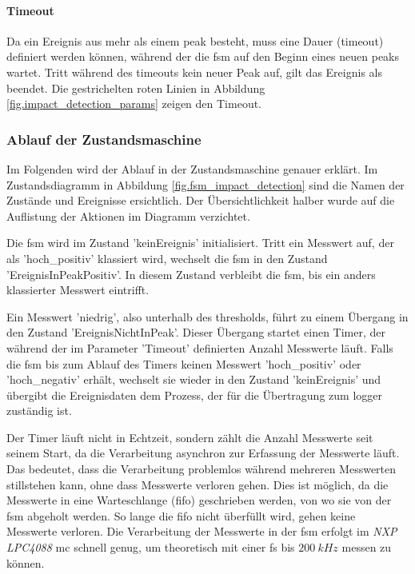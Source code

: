 \paragraph{Timeout} Da ein Ereignis aus mehr als einem \gls{peak} besteht, muss eine Dauer (\gls{timeout}) definiert werden können, während der die \gls{fsm} auf den Beginn eines neuen \gls{peak}s wartet. Tritt während des \gls{timeout}s kein neuer Peak auf, gilt das Ereignis als beendet. Die gestrichelten roten Linien in Abbildung \ref{fig.impact_detection_params} zeigen den Timeout.

\subsubsection{Ablauf der Zustandsmaschine}
Im Folgenden wird der Ablauf in der Zustandsmaschine genauer erklärt. Im Zustandsdiagramm in Abbildung \ref{fig.fsm_impact_detection} sind die Namen der Zustände und Ereignisse ersichtlich. Der Übersichtlichkeit halber wurde auf die Auflistung der Aktionen im Diagramm verzichtet.

Die \gls{fsm} wird im Zustand 'keinEreignis' initialisiert. Tritt ein Messwert auf, der als 'hoch\_positiv' klassiert wird, wechselt die \gls{fsm} in den Zustand 'EreignisInPeakPositiv'. In diesem Zustand verbleibt die \gls{fsm}, bis ein anders klassierter Messwert eintrifft. 

Ein Messwert 'niedrig', also unterhalb des \gls{threshold}s, führt zu einem Übergang in den Zustand 'EreignisNichtInPeak'. Dieser Übergang startet einen Timer, der während der im Parameter 'Timeout' definierten Anzahl Messwerte läuft. Falls die \gls{fsm} bis zum Ablauf des Timers keinen Messwert 'hoch\_positiv' oder 'hoch\_negativ' erhält, wechselt sie wieder in den Zustand 'keinEreignis' und übergibt die Ereignisdaten dem Prozess, der für die Übertragung zum \gls{logger} zuständig ist. 

Der Timer läuft nicht in Echtzeit, sondern zählt die Anzahl Messwerte seit seinem Start, da die Verarbeitung asynchron zur Erfassung der Messwerte läuft. Das bedeutet, dass die Verarbeitung problemlos während mehreren Messwerten stillstehen kann, ohne dass Messwerte verloren gehen. Dies ist möglich, da die Messwerte in eine Warteschlange (\gls{fifo}) geschrieben werden, von wo sie von der \gls{fsm} abgeholt werden. So lange die \gls{fifo} nicht überfüllt wird, gehen keine Messwerte verloren. Die Verarbeitung der Messwerte in der \gls{fsm} erfolgt im \emph{NXP LPC4088} \gls{mc} schnell genug, um theoretisch mit einer \gls{fs} bis \ensuremath{200~kHz} messen zu können.

